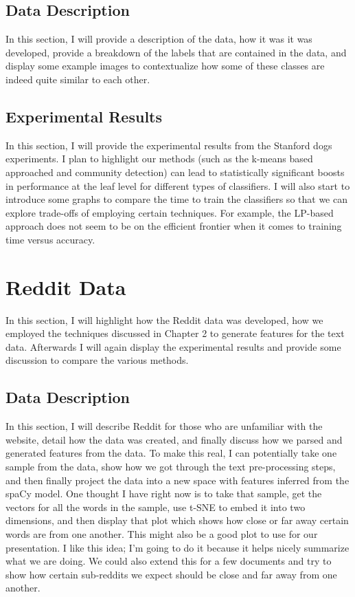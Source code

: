 \documentclass[../thesis.tex]{subfiles}
\begin{document}
\subsection{Data Description}
In this section, I will provide a description of the data, how it was it was developed, provide a breakdown of the labels that are contained in the data, and display some example images to contextualize how some of these classes are indeed quite similar to each other. 

\subsection{Experimental Results}
In this section, I will provide the experimental results from the Stanford dogs experiments. I plan to highlight our methods (such as the k-means based approached and community detection) can lead to statistically significant boosts in performance at the leaf level for different types of classifiers. I will also start to introduce some graphs to compare the time to train the classifiers so that we can explore trade-offs of employing certain techniques. For example, the LP-based approach does not seem to be on the efficient frontier when it comes to training time versus accuracy. 

\section{Reddit Data}
In this section, I will highlight how the Reddit data was developed, how we employed the techniques discussed in Chapter 2 to generate features for the text data. Afterwards I will again display the experimental results and provide some discussion to compare the various methods.

\subsection{Data Description}
In this section, I will describe Reddit for those who are unfamiliar with the website, detail how the data was created, and finally discuss how we parsed and generated features from the data. To make this real, I can potentially take one sample from the data, show how we got through the text pre-processing steps, and then finally project the data into a new space with features inferred from the spaCy model. One thought I have right now is to take that sample, get the vectors for all the words in the sample, use t-SNE to embed it into two dimensions, and then display that plot which shows how close or far away certain words are from one another. This might also be a good plot to use for our presentation. I like this idea; I'm going to do it because it helps nicely summarize what we are doing. We could also extend this for a few documents and try to show how certain sub-reddits we expect should be close and far away from one another. 
\end{document}
